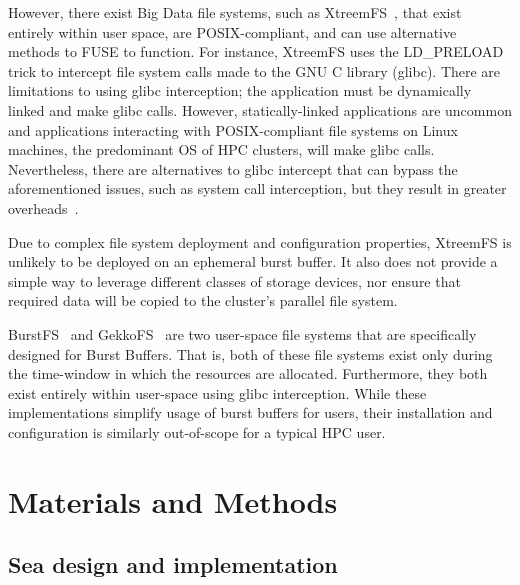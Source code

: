 \documentclass[10pt,journal,compsoc]{IEEEtran}
\begin{document}
      However, there exist Big Data file systems, such as
      XtreemFS~\cite{xtreemfs}, that exist entirely within user space, are
      POSIX-compliant, and can use alternative methods to FUSE to function. For
      instance, XtreemFS uses the LD\_PRELOAD trick to intercept file system
      calls made to the GNU C library (glibc). There are limitations to using
      glibc interception; the application must be dynamically linked and make
      glibc calls. However, statically-linked applications are uncommon and
      applications interacting with POSIX-compliant file systems on Linux
      machines, the predominant OS of HPC clusters, will make glibc calls.
      Nevertheless, there are alternatives to glibc intercept that can bypass
      the aforementioned issues, such as system call interception, but they
      result in greater overheads~\cite{quinson}.

      Due to complex file system deployment and configuration properties,
      XtreemFS is unlikely to be deployed on an ephemeral burst buffer. It also
      does not provide a simple way to leverage different classes of storage
      devices, nor ensure that required data will be copied to the cluster's
      parallel file system.

      BurstFS~\cite{burstfs} and GekkoFS~\cite{gekkofs} are two user-space file
      systems that are specifically designed for Burst Buffers. That is, both of
      these file systems exist only during the time-window in which the
      resources are allocated. Furthermore, they both exist entirely within
      user-space using glibc interception. While these implementations simplify
      usage of burst buffers for users, their installation and configuration is
      similarly out-of-scope for a typical HPC user.

\section{Materials and Methods}

\subsection{Sea design and implementation}
\end{document}
